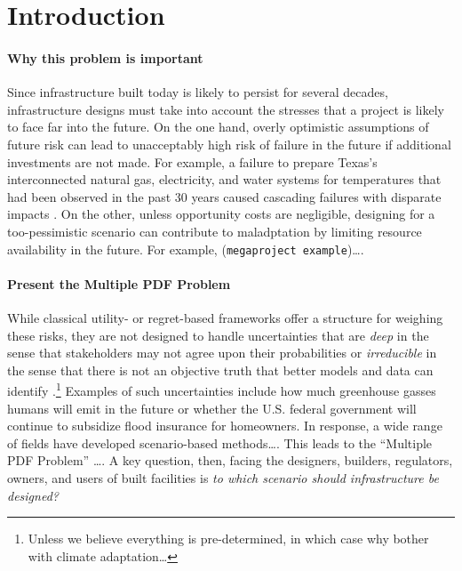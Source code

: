 \documentclass[12pt]{article}
\begin{document}
\clearpage
\section{Introduction}

\paragraph{Why this problem is important}
Since infrastructure built today is likely to persist for several decades, infrastructure designs must take into account the stresses that a project is likely to face far into the future.
On the one hand, overly optimistic assumptions of future risk can lead to unacceptably high risk of failure in the future if additional investments are not made.
For example, a failure to prepare Texas's interconnected natural gas, electricity, and water systems for temperatures that had been observed in the past 30 years caused cascading failures with disparate impacts \citep{doss-gollin_codes_txtreme:2021}.
On the other, unless opportunity costs are negligible, designing for a too-pessimistic scenario can contribute to maladptation by limiting resource availability in the future.
For example, (\texttt{megaproject example})\ldots.

\paragraph{Present the Multiple PDF Problem}
While classical utility- or regret-based frameworks offer a structure for weighing these risks, they are not designed to handle uncertainties that are \emph{deep} in the sense that stakeholders may not agree upon their probabilities \citep{lempert_complex:2002} or \emph{irreducible} in the sense that there is not an objective truth that better models and data can identify \citep{DossGollin:2019}.\footnote{Unless we believe everything is pre-determined, in which case why bother with climate adaptation\ldots}
Examples of such uncertainties include how much greenhouse gasses humans will emit in the future or whether the U.S. federal government will continue to subsidize flood insurance for homeowners.
In response, a wide range of fields have developed scenario-based methods\ldots.
This leads to the ``Multiple PDF Problem'' \citep{sharma_rcp:2021}\ldots.
A key question, then, facing the designers, builders, regulators, owners, and users of built facilities is \emph{to which scenario should infrastructure be designed?}
\end{document}
